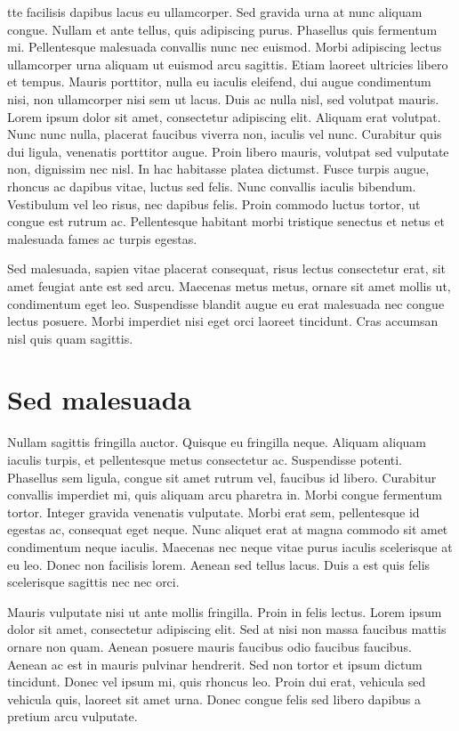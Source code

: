 tte facilisis dapibus lacus eu ullamcorper. Sed gravida urna at nunc aliquam congue. Nullam et ante tellus, quis adipiscing purus. Phasellus quis fermentum mi. Pellentesque malesuada convallis nunc nec euismod. Morbi adipiscing lectus ullamcorper urna aliquam ut euismod arcu sagittis. Etiam laoreet ultricies libero et tempus. Mauris porttitor, nulla eu iaculis eleifend, dui augue condimentum nisi, non ullamcorper nisi sem ut lacus. Duis ac nulla nisl, sed volutpat mauris. Lorem ipsum dolor sit amet, consectetur adipiscing elit. Aliquam erat volutpat. Nunc nunc nulla, placerat faucibus viverra non, iaculis vel nunc. Curabitur quis dui ligula, venenatis porttitor augue. Proin libero mauris, volutpat sed vulputate non, dignissim nec nisl. In hac habitasse platea dictumst. Fusce turpis augue, rhoncus ac dapibus vitae, luctus sed felis. Nunc convallis iaculis bibendum. Vestibulum vel leo risus, nec dapibus felis. Proin commodo luctus tortor, ut congue est rutrum ac. Pellentesque habitant morbi tristique senectus et netus et malesuada fames ac turpis egestas.

Sed malesuada, sapien vitae placerat consequat, risus lectus consectetur erat, sit amet feugiat ante est sed arcu. Maecenas metus metus, ornare sit amet mollis ut, condimentum eget leo. Suspendisse blandit augue eu erat malesuada nec congue lectus posuere. Morbi imperdiet nisi eget orci laoreet tincidunt. Cras accumsan nisl quis quam sagittis. 

\section{Sed malesuada}

Nullam sagittis fringilla auctor. Quisque eu fringilla neque. Aliquam aliquam iaculis turpis, et pellentesque metus consectetur ac. Suspendisse potenti. Phasellus sem ligula, congue sit amet rutrum vel, faucibus id libero. Curabitur convallis imperdiet mi, quis aliquam arcu pharetra in. Morbi congue fermentum tortor. Integer gravida venenatis vulputate. Morbi erat sem, pellentesque id egestas ac, consequat eget neque. Nunc aliquet erat at magna commodo sit amet condimentum neque iaculis. Maecenas nec neque vitae purus iaculis scelerisque at eu leo. Donec non facilisis lorem. Aenean sed tellus lacus. Duis a est quis felis scelerisque sagittis nec nec orci.

Mauris vulputate nisi ut ante mollis fringilla. Proin in felis lectus. Lorem ipsum dolor sit amet, consectetur adipiscing elit. Sed at nisi non massa faucibus mattis ornare non quam. Aenean posuere mauris faucibus odio faucibus faucibus. Aenean ac est in mauris pulvinar hendrerit. Sed non tortor et ipsum dictum tincidunt. Donec vel ipsum mi, quis rhoncus leo. Proin dui erat, vehicula sed vehicula quis, laoreet sit amet urna. Donec congue felis sed libero dapibus a pretium arcu vulputate. 

